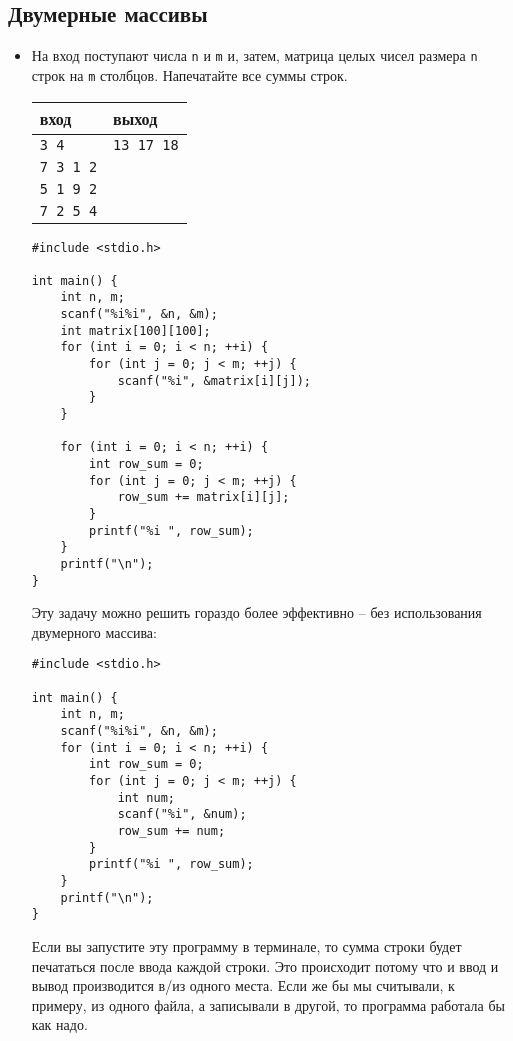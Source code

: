 \documentclass{article}
\begin{document}
\subsection*{Двумерные массивы}
\begin{itemize}
\item На вход поступают числа \texttt{n} и \texttt{m} и, затем, матрица целых чисел размера \texttt{n} строк на \texttt{m} столбцов. Напечатайте все суммы строк.
\begin{center}
\begin{tabular}{ l | l }
 вход & выход \\ \hline
 \texttt{3 4} & \texttt{13 17 18}  \\ 
 \texttt{7 3 1 2} &  \\ 
 \texttt{5 1 9 2} &  \\ 
 \texttt{7 2 5 4} &  \\ 
\end{tabular}
\end{center}

\begin{lstlisting}[backgroundcolor = \color{solcolor}]
#include <stdio.h>

int main() {
    int n, m;
    scanf("%i%i", &n, &m);
    int matrix[100][100];
    for (int i = 0; i < n; ++i) {
        for (int j = 0; j < m; ++j) {
            scanf("%i", &matrix[i][j]);
        }
    }
    
    for (int i = 0; i < n; ++i) {
        int row_sum = 0;
        for (int j = 0; j < m; ++j) {
            row_sum += matrix[i][j];
        }
        printf("%i ", row_sum);
    }
    printf("\n");
}
\end{lstlisting}
Эту задачу можно решить гораздо более эффективно -- без использования двумерного массива:
\begin{lstlisting}[backgroundcolor = \color{solcolor}]
#include <stdio.h>

int main() {
    int n, m;
    scanf("%i%i", &n, &m);
    for (int i = 0; i < n; ++i) {
        int row_sum = 0;
        for (int j = 0; j < m; ++j) {
            int num;
            scanf("%i", &num);
            row_sum += num;
        }
        printf("%i ", row_sum);
    }
    printf("\n");
}
\end{lstlisting}
Если вы запустите эту программу в терминале, то сумма строки будет печататься после ввода каждой строки. Это происходит потому что и ввод и вывод производится в/из одного места. Если же бы мы считывали, к примеру, из одного файла, а записывали в другой, то программа работала бы как надо.


\end{itemize}
\end{document}
